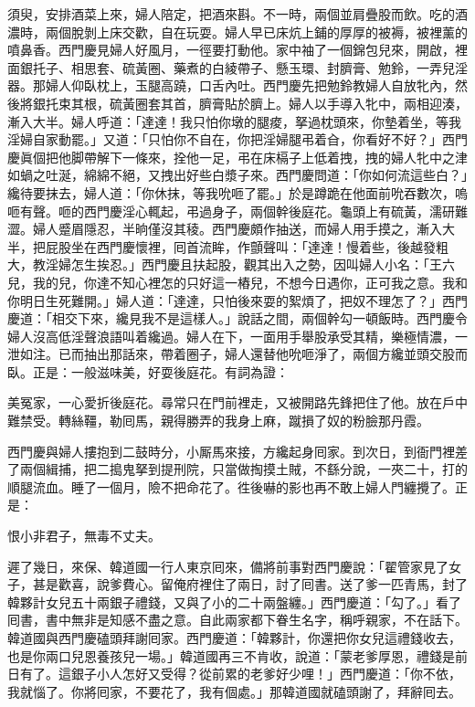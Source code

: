 須臾，安排酒菜上來，婦人陪定，把酒來斟。不一時，兩個並肩疊股而飲。吃的酒濃時，兩個脫剝上床交歡，自在玩耍。婦人早已床炕上鋪的厚厚的被褥，被裡薰的噴鼻香。西門慶見婦人好風月，一徑要打動他。家中袖了一個錦包兒來，開啟，裡面銀托子、相思套、硫黃圈、藥煮的白綾帶子、懸玉環、封臍膏、勉鈴，一弄兒淫器。那婦人仰臥枕上，玉腿高蹺，口舌內吐。西門慶先把勉鈴教婦人自放牝內，然後將銀托束其根，硫黃圈套其首，臍膏貼於臍上。婦人以手導入牝中，兩相迎湊，漸入大半。婦人呼道：「達達！我只怕你墩的腿痠，拏過枕頭來，你墊着坐，等我淫婦自家動罷。」{}又道：「只怕你不自在，你把淫婦腿弔着㒲，你看好不好？」西門慶眞個把他脚帶解下一條來，拴他一足，弔在床槅子上低着拽，拽的婦人牝中之津如蝸之吐涎，綿綿不絕，又拽出好些白漿子來。西門慶問道：「你如何流這些白？」纔待要抹去，婦人道：「你休抹，等我吮咂了罷。」於是蹲跪在他面前吮吞數次，嗚咂有聲。咂的西門慶淫心輒起，弔過身子，兩個幹後庭花。龜頭上有硫黃，濡研難澀。婦人蹙眉隱忍，半晌僅沒其稜。西門慶頗作抽送，而婦人用手摸之，漸入大半，把屁股坐在西門慶懷裡，囘首流眸，作顫聲叫：「達達！慢着些，後越發粗大，教淫婦怎生挨忍。」西門慶且扶起股，觀其出入之勢，因叫婦人小名：「王六兒，我的兒，你達不知心裡怎的只好這一樁兒，不想今日遇你，正可我之意。我和你明日生死難開。」婦人道：「達達，只怕後來耍的絮煩了，把奴不理怎了？」西門慶道：「相交下來，纔見我不是這樣人。」說話之間，兩個幹勾一頓飯時。西門慶令婦人沒高低淫聲浪語叫着纔過。婦人在下，一面用手舉股承受其精，樂極情濃，一泄如注。已而抽出那話來，帶着圈子，婦人還替他吮咂淨了，兩個方纔並頭交股而臥。正是：一般滋味美，好耍後庭花。有詞為證：

\begin{myquote}
美冤家，一心愛折後庭花。尋常只在門前裡走，又被開路先鋒把住了他。放在戶中難禁受。轉絲韁，勒囘馬，親得勝弄的我身上麻，蹴損了奴的粉臉那丹霞。
\end{myquote}

西門慶與婦人摟抱到二鼓時分，小厮馬來接，方纔起身囘家。到次日，到衙門裡差了兩個緝捕，把二搗鬼拏到提刑院，只當做掏摸土賊，不繇分說，一夾二十，打的順腿流血。睡了一個月，險不把命花了。徃後嚇的影也再不敢上婦人門纏攪了。正是：

\begin{myquote}
恨小非君子，無毒不丈夫。
\end{myquote}

遲了幾日，來保、韓道國一行人東京囘來，備將前事對西門慶說：「翟管家見了女子，甚是歡喜，說爹費心。留俺府裡住了兩日，討了囘書。送了爹一匹青馬，封了韓夥計女兒五十兩銀子禮錢，又與了小的二十兩盤纏。」西門慶道：「勾了。」看了囘書，書中無非是知感不盡之意。自此兩家都下眷生名字，稱呼親家，{}不在話下。韓道國與西門慶磕頭拜謝囘家。西門慶道：「韓夥計，你還把你女兒這禮錢收去，也是你兩口兒恩養孩兒一場。」韓道國再三不肯收，說道：「蒙老爹厚恩，禮錢是前日有了。這銀子小人怎好又受得？從前累的老爹好少哩！」西門慶道：「你不依，我就惱了。你將囘家，不要花了，我有個處。」那韓道國就磕頭謝了，拜辭囘去。

